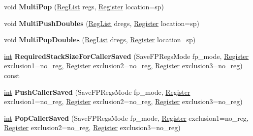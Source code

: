 \begin{DoxyCompactItemize}
void {\bfseries Multi\+Pop} (\mbox{\hyperlink{classuint32__t}{Reg\+List}} regs, \mbox{\hyperlink{classv8_1_1internal_1_1Register}{Register}} location=sp)
\item 
\mbox{\label{classv8_1_1internal_1_1TurboAssembler_a0d87a83feaf28c9b8e70c072b61b150c}} 
void {\bfseries Multi\+Push\+Doubles} (\mbox{\hyperlink{classuint32__t}{Reg\+List}} dregs, \mbox{\hyperlink{classv8_1_1internal_1_1Register}{Register}} location=sp)
\item 
\mbox{\label{classv8_1_1internal_1_1TurboAssembler_a8ff4ea98fca2313a326d1a16bbb77a95}} 
void {\bfseries Multi\+Pop\+Doubles} (\mbox{\hyperlink{classuint32__t}{Reg\+List}} dregs, \mbox{\hyperlink{classv8_1_1internal_1_1Register}{Register}} location=sp)
\item 
\mbox{\label{classv8_1_1internal_1_1TurboAssembler_ade281f6d328e2fdd51963e91bda13365}} 
\mbox{\hyperlink{classint}{int}} {\bfseries Required\+Stack\+Size\+For\+Caller\+Saved} (Save\+F\+P\+Regs\+Mode fp\+\_\+mode, \mbox{\hyperlink{classv8_1_1internal_1_1Register}{Register}} exclusion1=no\+\_\+reg, \mbox{\hyperlink{classv8_1_1internal_1_1Register}{Register}} exclusion2=no\+\_\+reg, \mbox{\hyperlink{classv8_1_1internal_1_1Register}{Register}} exclusion3=no\+\_\+reg) const
\item 
\mbox{\label{classv8_1_1internal_1_1TurboAssembler_a05799e0b139129becdabdf8af8e18810}} 
\mbox{\hyperlink{classint}{int}} {\bfseries Push\+Caller\+Saved} (Save\+F\+P\+Regs\+Mode fp\+\_\+mode, \mbox{\hyperlink{classv8_1_1internal_1_1Register}{Register}} exclusion1=no\+\_\+reg, \mbox{\hyperlink{classv8_1_1internal_1_1Register}{Register}} exclusion2=no\+\_\+reg, \mbox{\hyperlink{classv8_1_1internal_1_1Register}{Register}} exclusion3=no\+\_\+reg)
\item 
\mbox{\label{classv8_1_1internal_1_1TurboAssembler_a5f104f3d3c969b063fb4d1dfdc643b1c}} 
\mbox{\hyperlink{classint}{int}} {\bfseries Pop\+Caller\+Saved} (Save\+F\+P\+Regs\+Mode fp\+\_\+mode, \mbox{\hyperlink{classv8_1_1internal_1_1Register}{Register}} exclusion1=no\+\_\+reg, \mbox{\hyperlink{classv8_1_1internal_1_1Register}{Register}} exclusion2=no\+\_\+reg, \mbox{\hyperlink{classv8_1_1internal_1_1Register}{Register}} exclusion3=no\+\_\+reg)

\end{DoxyCompactItemize}
